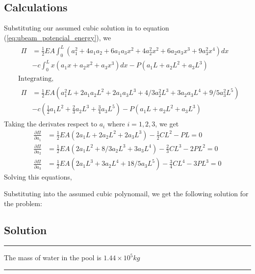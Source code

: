 \documentclass[a4paper]{memoir}
\begin{document}
\subsection{Calculations}
Substituting our assumed cubic solution in to equation (\ref{eq:ubeam_potencial_energy}), we 
\begin{align*}
	&
	\begin{split}
	\Pi &= \frac{1}{2} EA \int^L_0 (a_1^2+4a_1a_2+6a_1a_3x^2+4a_2^2x^2+6a_2a_3x^3+9a_3^2x^4)dx \\ 
			&- c \int^L_0 x(a_1x+a_2x^2+a_3x^3)dx - P(a_1L+a_2L^2+a_3L^3)
	\end{split} \\
	&\text{Integrating,} \\
	&
	\begin{split}
	\Pi &= \frac{1}{2} EA (a_1^2L+2a_1a_2L^2+2a_1a_3L^3+4/3a_2^2L^3+3a_2a_3L^4+9/5a_3^2L^5) \\
			&- c(\frac{1}{2}a_1L^2+\frac{2}{3}a_2L^3+\frac{3}{4}a_3L^5) - P(a_1L+a_2L^2+a_3L^3)
	\end{split} 
	\end{align*} 
	Taking the derivates respect to $a_i$ where $i = 1,2,3$, we get
	\begin{align*}
	\frac{\partial \Pi}{\partial a_1} &=	\frac{1}{2} EA (2a_1L+2a_2L^2+2a_3L^3) - \frac{1}{2}CL^2 - PL = 0 \\
	\frac{\partial \Pi}{\partial a_2} &=	\frac{1}{2} EA (2a_1L^2+8/3a_2L^3+3a_3L^4) - \frac{2}{3}CL^3 - 2PL^2 = 0 \\
	\frac{\partial \Pi}{\partial a_3} &=	\frac{1}{2} EA (2a_1L^3+3a_2L^4+18/5a_3L^5) - \frac{3}{4}CL^4 - 3PL^3 = 0 
	\end{align*}
	Solving this equations,
	
	Substituting into the assumed cubic polynomail, we get the following solution for the problem:

\subsection{Solution}
\begin{minipage}{300pt}
	\begin{center}{
		\begin{shaded}
			\hrule
			\vspace{20pt}
			The mass of water in the pool is $1.44 \times 10^5 kg$  %
			\vspace{16pt}
			\hrule
		\end{shaded}
	}
	\end{center}
\end{minipage}
\end{document}
